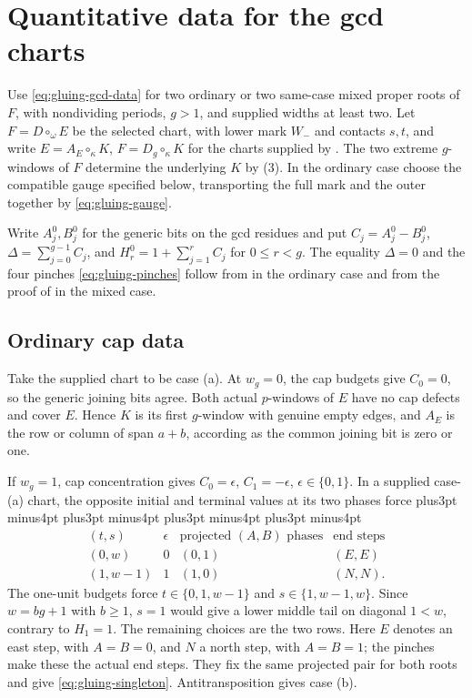 \documentclass[11pt,a4paper]{amsart}
\numberwithin{equation}{section}
\theoremstyle{plain}
\theoremstyle{definition}
\begin{document}
\appendix
\section{Quantitative data for the gcd charts}\label{app:gluing-fold-data}

Use \eqref{eq:gluing-gcd-data} for two ordinary or two same-case
mixed proper roots of \(F\), with nondividing periods, \(g>1\),
and supplied widths at least two.  Let
\(F=D\circ_\omega E\) be the selected chart, with lower mark
\(W_-\) and contacts \(s,t\), and write
\(E=A_E\circ_\kappa K\), \(F=D_g\circ_\kappa K\) for the charts
supplied by .
The two extreme \(g\)-windows of \(F\) determine the underlying
\(K\) by (3).  In the ordinary case choose
the compatible gauge specified below, transporting the full mark
and the outer together by \eqref{eq:gluing-gauge}.

Write \(A^0_j,B^0_j\) for the generic bits on the gcd residues and
put \(C_j=A^0_j-B^0_j\), \(\Delta=\sum_{j=0}^{g-1}C_j\), and
\(H^0_r=1+\sum_{j=1}^r C_j\) for \(0\le r<g\).
The equality \(\Delta=0\) and the four pinches
\eqref{eq:gluing-pinches} follow from
 in the ordinary case and from the
proof of  in the mixed case.

\subsection{Ordinary cap data}

Take the supplied chart to be case (a).  At \(w_g=0\), the cap
budgets give \(C_0=0\), so the generic joining bits agree.
Both actual \(p\)-windows of \(E\) have no cap defects and cover
\(E\).  Hence \(K\) is its first \(g\)-window with genuine empty
edges, and \(A_E\) is the row or column of span \(a+b\), according
as the common joining bit is zero or one.

If \(w_g=1\), cap concentration gives \(C_0=\epsilon\), \(C_1=-\epsilon\), \(\epsilon\in\{0,1\}\).  In a supplied case-(a) chart, the opposite initial and terminal values at its two phases force
{\abovedisplayskip=14pt plus3pt minus4pt \belowdisplayskip=14pt plus3pt minus4pt
 \abovedisplayshortskip=14pt plus3pt minus4pt \belowdisplayshortskip=14pt plus3pt minus4pt
\begin{equation*}
 \begin{array}{c|c|c|c}
 (t,s)&\epsilon&\text{projected }(A,B)\text{ phases}&\text{end steps}\\ \hline
 (0,w)&0&(0,1)&(E,E)\\
 (1,w-1)&1&(1,0)&(N,N).
 \end{array}
\end{equation*}}
The one-unit budgets force \(t\in\{0,1,w-1\}\) and
\(s\in\{1,w-1,w\}\).  Since \(w=bg+1\) with \(b\ge1\),
\(s=1\) would give a lower middle tail on diagonal \(1<w\),
contrary to \(H_1=1\).  The remaining choices are the two rows.
Here \(E\) denotes an east step, with \(A=B=0\), and \(N\) a
north step, with \(A=B=1\); the pinches make these the actual
end steps.  They fix the same projected pair for both roots and
give \eqref{eq:gluing-singleton}.  Antitransposition gives case (b).
\end{document}
